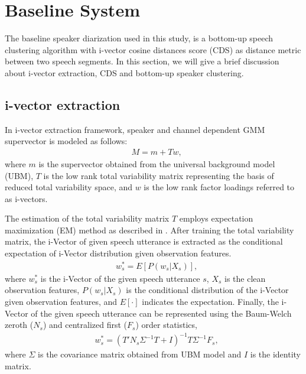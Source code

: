 \documentclass[journal]{IEEEtran}
\begin{document}
\section{Baseline System}
\label{bs}
The baseline speaker diarization used in this study, is a bottom-up speech clustering algorithm with i-vector cosine distances score (CDS) as distance metric between two speech segments. In this section, we will give a brief discussion about i-vector extraction, CDS and bottom-up speaker clustering. 

\subsection{i-vector extraction}
In i-vector extraction framework, speaker and channel dependent GMM supervector is modeled as follows:
\begin{equation}
\begin{aligned}
& M=m+Tw,
\label{mmtw}
\end{aligned}
\end{equation}
where $m$ is the supervector obtained from the universal background model (UBM), 
$T$ is the low rank total variability matrix representing the basis of reduced total variability space, 
and $w$ is the low rank factor loadings referred to as i-vectors. 

The estimation of the total variability matrix $T$ employs expectation maximization (EM) method as described in \cite{kenny2005eigenvoice}. 
After training the total variability matrix, 
the i-Vector of given speech utterance is extracted as the conditional expectation of i-Vector distribution given observation features.
\begin{equation}
\begin{aligned}
&w_{s}^{\ast}=E[P(w_{s}|X_{s})],
\label{eq:ws}
\end{aligned}
\end{equation}
where $w_{s}^{\ast}$ is the i-Vector of the given speech utterance $s$, 
$X_{s}$ is the clean observation features, 
$P(w_{s}|X_{s})$ is the conditional distribution of the i-Vector given observation features, 
and $E[\cdot]$ indicates the expectation. 
Finally, the i-Vector of the given speech utterance can be represented using the Baum-Welch zeroth ($N_s$) and centralized first ($F_s$) order statistics,
\begin{equation}
\begin{aligned}
&w_{s}^{\ast}=(T'N_{s}\Sigma^{-1}T+I)^{-1}T\Sigma^{-1}F_{s},
\label{ws2}
\end{aligned}
\end{equation}
where $\Sigma$ is the covariance matrix obtained from UBM model and $I$ is the identity matrix.
\end{document}
